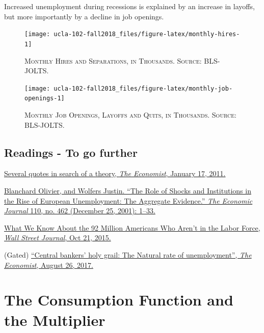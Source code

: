 \documentclass[]{book}
\theoremstyle{definition}
\theoremstyle{definition}
\theoremstyle{definition}
\theoremstyle{remark}
\begin{document}
Increased unemployment during recessions is explained by an increase in
layoffs, but more importantly by a decline in job openings.




\begin{figure}

{\centering \texttt{[image: ucla-102-fall2018\_files/figure-latex/monthly-hires-1]} 

}

\caption{\textsc{Monthly Hires and Separations, in Thousands.
Source: BLS-JOLTS}.}\label{fig:monthly-hires}
\end{figure}




\begin{figure}

{\centering \texttt{[image: ucla-102-fall2018\_files/figure-latex/monthly-job-openings-1]} 

}

\caption{\textsc{Monthly Job Openings, Layoffs and
Quits, in Thousands. Source: BLS-JOLTS}.}\label{fig:monthly-job-openings}
\end{figure}

\section*{Readings - To go further}\label{readings---to-go-further-3}

\href{https://www.economist.com/free-exchange/2011/01/17/several-quotes-in-search-of-a-theory}{Several
quotes in search of a theory, \emph{The Economist}, January 17, 2011.}

\href{https://doi.org/10.1111/1468-0297.00518}{Blanchard Olivier, and
Wolfers Justin. ``The Role of Shocks and Institutions in the Rise of
European Unemployment: The Aggregate Evidence.'' \emph{The Economic
Journal} 110, no. 462 (December 25, 2001): 1--33.}

\href{https://blogs.wsj.com/economics/2015/10/21/what-we-know-about-the-92-million-americans-who-arent-in-the-labor-force/}{What
We Know About the 92 Million Americans Who Aren't in the Labor Force,
\emph{Wall Street Journal}, Oct 21, 2015.}

(Gated)
\href{https://www.economist.com/economics-brief/2017/08/26/the-natural-rate-of-unemployment}{``Central
bankers' holy grail: The Natural rate of unemployment'', \emph{The
Economist}, August 26, 2017.}

\hypertarget{cons-function}{\chapter{The Consumption Function and the
Multiplier}\label{cons-function}}
\end{document}
